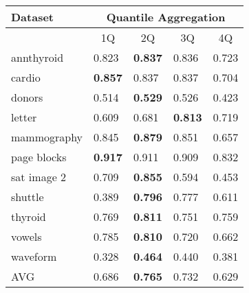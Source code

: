 \begin{table}[]
\begin{tabular}{|l|llll|}
\hline
Dataset     & \multicolumn{4}{c|}{Quantile Aggregation}                                                                                                 \\ \hline
            & \multicolumn{1}{c|}{1Q}             & \multicolumn{1}{c|}{2Q}             & \multicolumn{1}{c|}{3Q}             & \multicolumn{1}{c|}{4Q} \\ \hline
annthyroid  & \multicolumn{1}{l|}{0.823}          & \multicolumn{1}{l|}{\textbf{0.837}} & \multicolumn{1}{l|}{0.836}          & 0.723                   \\ \hline
cardio      & \multicolumn{1}{l|}{\textbf{0.857}} & \multicolumn{1}{l|}{0.837}          & \multicolumn{1}{l|}{0.837}          & 0.704                   \\ \hline
donors      & \multicolumn{1}{l|}{0.514}          & \multicolumn{1}{l|}{\textbf{0.529}} & \multicolumn{1}{l|}{0.526}          & 0.423                   \\ \hline
letter      & \multicolumn{1}{l|}{0.609}          & \multicolumn{1}{l|}{0.681}          & \multicolumn{1}{l|}{\textbf{0.813}} & 0.719                   \\ \hline
mammography & \multicolumn{1}{l|}{0.845}          & \multicolumn{1}{l|}{\textbf{0.879}} & \multicolumn{1}{l|}{0.851}          & 0.657                   \\ \hline
page blocks & \multicolumn{1}{l|}{\textbf{0.917}} & \multicolumn{1}{l|}{0.911}          & \multicolumn{1}{l|}{0.909}          & 0.832                   \\ \hline
sat image 2 & \multicolumn{1}{l|}{0.709}          & \multicolumn{1}{l|}{\textbf{0.855}} & \multicolumn{1}{l|}{0.594}          & 0.453                   \\ \hline
shuttle     & \multicolumn{1}{l|}{0.389}          & \multicolumn{1}{l|}{\textbf{0.796}} & \multicolumn{1}{l|}{0.777}          & 0.611                   \\ \hline
thyroid     & \multicolumn{1}{l|}{0.769}          & \multicolumn{1}{l|}{\textbf{0.811}} & \multicolumn{1}{l|}{0.751}          & 0.759                   \\ \hline
vowels      & \multicolumn{1}{l|}{0.785}          & \multicolumn{1}{l|}{\textbf{0.810}} & \multicolumn{1}{l|}{0.720}          & 0.662                   \\ \hline
waveform    & \multicolumn{1}{l|}{0.328}          & \multicolumn{1}{l|}{\textbf{0.464}} & \multicolumn{1}{l|}{0.440}          & 0.381                   \\ \hline
AVG         & \multicolumn{1}{l|}{0.686}          & \multicolumn{1}{l|}{\textbf{0.765}} & \multicolumn{1}{l|}{0.732}          & 0.629                   \\ \hline
\end{tabular}
\end{table}
